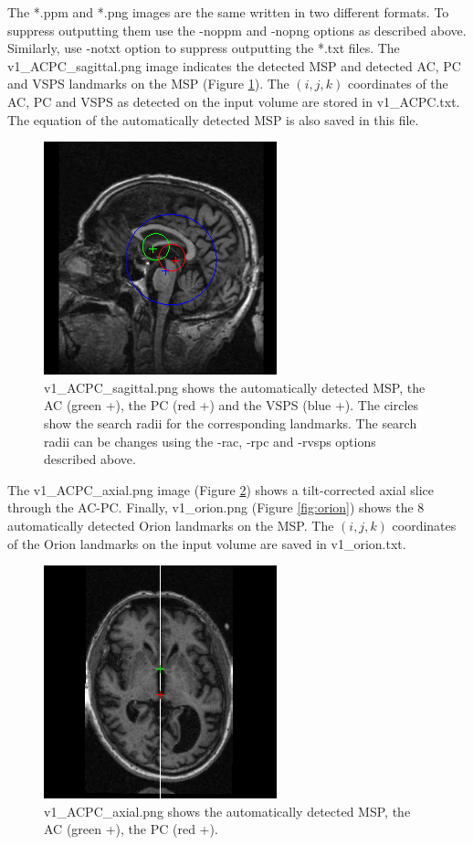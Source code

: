 \documentclass[11pt]{article}
\begin{document}
\noindent The *.ppm and *.png images are the same written in two different formats.  To suppress outputting them use the
-noppm and -nopng options as described above.  Similarly, use -notxt option to suppress outputting the *.txt 
files.  The v1\_ACPC\_sagittal.png image indicates the detected MSP and detected AC, PC and VSPS landmarks on the
MSP (Figure \ref{fig:sagittal}).  The $(i,j,k)$ coordinates of the AC, PC and VSPS as detected on the input 
volume are stored in v1\_ACPC.txt.  The equation of the automatically detected MSP is also saved in this file.
\begin{figure}
\begin{center}
\includegraphics[scale=1.0]{v1_ACPC_sagittal.png}
\caption{v1\_ACPC\_sagittal.png shows the automatically detected MSP, the AC (green +), the PC (red +) and
the VSPS (blue +).  The circles show the search radii for the corresponding landmarks.  The search radii
can be changes using the -rac, -rpc and -rvsps options described above.
}
\label{fig:sagittal}
\end{center}
\end{figure}

The v1\_ACPC\_axial.png image (Figure \ref{fig:axial}) shows a tilt-corrected axial slice through the AC-PC.
Finally, v1\_orion.png (Figure \ref{fig:orion}) shows the 8 automatically detected Orion landmarks on the
MSP.  The $(i,j,k)$ coordinates of the Orion landmarks on the input volume are saved in v1\_orion.txt. \\

\begin{figure}
\begin{center}
\includegraphics[scale=1.0]{v1_ACPC_axial.png}
\caption{v1\_ACPC\_axial.png shows the automatically detected MSP, the AC (green +), the PC (red +).
}
\label{fig:axial}
\end{center}
\end{figure}
\end{document}
